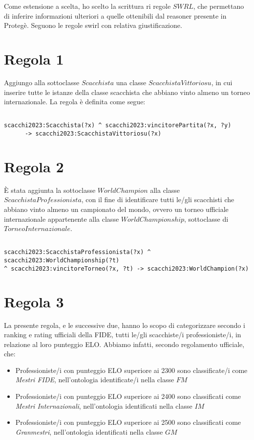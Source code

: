 \documentclass[12pt]{book}
\begin{document}
Come estensione a scelta, ho scelto la scrittura ri regole $SWRL$, che
permettano di inferire informazioni ulteriori a quelle ottenibili dal
reasoner presente in Protegè.
Seguono le regole swirl con relativa giustificazione.

\section{Regola 1}

Aggiungo alla sottoclasse $Scacchista$ una classe
$ScacchistaVittoriosu$, in cui inserire tutte le istanze della classe
scacchista che abbiano vinto almeno un torneo internazionale.
La regola è definita come segue:
\begin{verbatim}

scacchi2023:Scacchista(?x) ^ scacchi2023:vincitorePartita(?x, ?y) 
      -> scacchi2023:ScacchistaVittoriosu(?x)

\end{verbatim}

\section{Regola 2}

È stata aggiunta la sottoclasse $WorldChampion$ alla classe
$ScacchistaProfessionista$, con il fine di identificare tutti le/gli
scacchisti che abbiano vinto almeno un campionato del mondo, ovvero
un torneo ufficiale internazionale appartenente alla classe
$WorldChampionship$, sottoclasse di $TorneoInternazionale$.

\begin{verbatim}

scacchi2023:ScacchistaProfessionista(?x) ^ scacchi2023:WorldChampionship(?t) 
^ scacchi2023:vincitoreTorneo(?x, ?t) -> scacchi2023:WorldChampion(?x)

\end{verbatim}

\section{Regola 3}

La presente regola, e le successive due, hanno lo scopo di
categorizzare secondo i ranking e rating ufficiali della FIDE, tutti
le/gli scacchiste/i professioniste/i, in relazione al loro punteggio ELO.
Abbiamo infatti, secondo regolamento ufficiale, che:
\begin{itemize}
  \item Professioniste/i con punteggio ELO superiore ai 2300 sono
    classificate/i come \textit{Mestri FIDE}, nell'ontologia
    identificate/i nella classe $FM$
  \item Professioniste/i con punteggio ELO superiore ai 2400 sono
    classificati come \textit{Mestri Internazionali}, nell'ontologia
    identificati nella classe $IM$
  \item Professioniste/i con punteggio ELO superiore ai 2500 sono
    classificati come \textit{Granmestri}, nell'ontologia
    identificati nella classe $GM$
\end{itemize}
\end{document}
